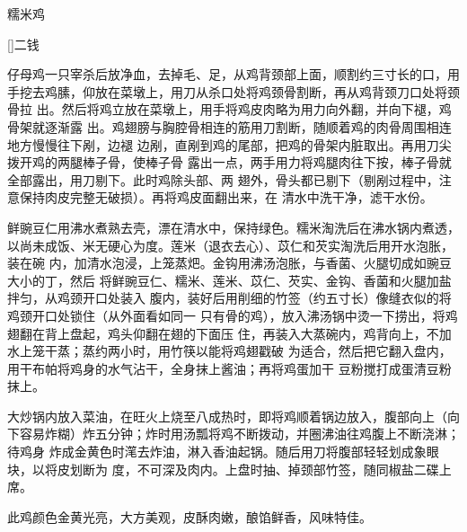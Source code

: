 \begin{recipe}[八宝糯米鸡]{糯米鸡}

\ingredients

[\footnotemark]{二钱}

\preparation

\step 仔母鸡一只宰杀后放净血，去掉毛、足，从鸡背颈部上面，顺割约三寸长的口，用
手挖去鸡膆，仰放在菜墩上，用刀从杀口处将鸡颈骨割断，再从鸡背颈刀口处将颈骨拉
出。然后将鸡立放在菜墩上，用手将鸡皮肉略为用力向外翻，并向下褪，鸡骨架就逐渐露
出。鸡翅膀与胸腔骨相连的筋用刀割断，随顺着鸡的肉骨周围相连地方慢慢往下剐，边褪
边剐，直剐到鸡的尾部，把鸡的骨架内脏取出。再用刀尖拨开鸡的两腿棒子骨，使棒子骨
露出一点，两手用力将鸡腿肉往下按，棒子骨就全部露出，用刀剔下。此时鸡除头部、两
翅外，骨头都已剔下（剔剐过程中，注意保持肉皮完整无破损）。再将鸡皮面翻出来，在
清水中洗干净，滤干水份。

\step 鲜豌豆仁用沸水煮熟去壳，漂在清水中，保持绿色。糯米淘洗后在沸水锅内煮透，
以尚未成饭、米无硬心为度。莲米（退衣去心）、苡仁和芡实淘洗后用开水泡胀，装在碗
内，加清水泡浸，上笼蒸𤆵。金钩用沸汤泡胀，与香菌、火腿切成如豌豆大小的丁，然后
将鲜豌豆仁、糯米、莲米、苡仁、芡实、金钩、香菌和火腿加盐拌匀，从鸡颈开口处装入
腹内，装好后用削细的竹签（约五寸长）像缝衣似的将鸡颈开口处锁住（从外面看如同一
只有骨的鸡），放入沸汤锅中烫一下捞出，将鸡翅翻在背上盘起，鸡头仰翻在翅的下面压
住，再装入大蒸碗内，鸡背向上，不加水上笼干蒸；蒸约两小时，用竹筷以能将鸡翅戳破
为适合，然后把它翻入盘内，用干布帕将鸡身的水气沾干，全身抹上酱油；再将鸡蛋加干
豆粉搅打成蛋清豆粉抹上。

\step 大炒锅内放入菜油，在旺火上烧至八成热时，即将鸡顺着锅边放入，腹部向上（向
下容易炸糊）炸五分钟；炸时用汤瓢将鸡不断拨动，并圈沸油往鸡腹上不断浇淋；待鸡身
炸成金黄色时滗去炸油，淋入香油起锅。随后用刀将腹部轻轻划成象眼块，以将皮划断为
度，不可深及肉内。上盘时抽、掉颈部竹签，随同椒盐二碟上席。

\features

此鸡颜色金黄光亮，大方美观，皮酥肉嫩，酿馅鲜香，风味特佳。


\end{recipe}

